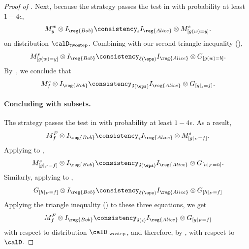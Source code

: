 \begin{proof}[Proof of ]
Next, because the strategy passes the test in  with probability at least $1-4\epsilon$,
\begin{equation}\label{eq:watch-out-for-the-triangle}
M^{w}_y \otimes I_{\reg{Bob}} \consistency_{\epsilon} I_{\reg{Alice}} \otimes M^s_{[g(w) = y]}.
\end{equation}
on distribution $\calD_{\mathrm{twostep}}$.
Combining  with our second triangle inequality (),
\begin{equation*}
M^s_{[g(w) = y]} \otimes I_{\reg{Bob}}
\consistency_{\delta(\eps)} I_{\reg{Alice}} \otimes G_{[g(w) = b]}.
\end{equation*}
By~, we conclude that
\begin{equation}\label{eq:finished-with-subspaces}
M^s_{f} \otimes I_{\reg{Bob}}
\consistency_{\delta(\eps)} I_{\reg{Alice}} \otimes G_{[g|_s = f]}.
\end{equation}

\paragraph{Concluding with subsets.}
The strategy passes the test in  with probability at least $1-4\epsilon$. As a result,
\begin{equation*}
M^F_f \otimes I_{\reg{Bob}}
\consistency_{\epsilon}
I_{\reg{Alice}} \otimes M^s_{[g|_F = f]}.
\end{equation*}
Applying  to ,
\begin{equation*}
M^s_{[g|_F=f]} \otimes I_{\reg{Bob}}
\consistency_{\delta(\eps)} I_{\reg{Alice}} \otimes G_{[h|_F = h]}.
\end{equation*}
Similarly, applying  to ,
\begin{equation*}
G_{[h|_F = f]} \otimes I_{\reg{Bob}} \consistency_{\delta(\eps)} I_{\reg{Alice}} \otimes G_{[h|_F=f]}
\end{equation*}
Applying the triangle inequality () to these three equations,
we get
\begin{equation*}
M^F_f \otimes I_{\reg{Bob}}
\consistency_{\delta(\epsilon)}
I_{\reg{Alice}} \otimes G_{[g|_{F} = f]}
\end{equation*}
with respect to distribution $\calD_{\mathrm{twostep}}$,
and therefore, by , with respect to $\calD$.
\end{proof}

